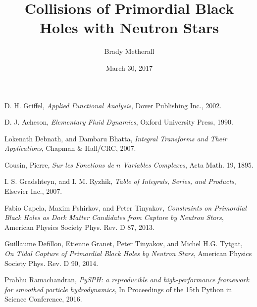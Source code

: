 \documentclass{jthesis}
\title{Collisions of Primordial Black Holes with Neutron Stars} %
\author{Brady Metherall}
\date{March 30, 2017}
\begin{document}
\maketitle



\makedeclaration

\maketableofcontents

\doublespacing
\linespread{2}









\begin{thebibliography}{9}

D. H. Griffel, \emph{Applied Functional Analysis}, Dover Publishing Inc., 2002.

D. J. Acheson, \emph{Elementary Fluid Dynamics}, Oxford University Press, 1990.

Lokenath Debnath, and Dambaru Bhatta, \emph{Integral Transforms and Their Applications}, Chapman \& Hall/CRC, 2007.

Cousin, Pierre, \emph{Sur les Fonctions de $n$ Variables Complexes}, Acta Math. 19, 1895.

I. S. Gradshteyn, and I. M. Ryzhik, \emph{Table of Integrals, Series, and Products}, Elsevier Inc., 2007.

Fabio Capela, Maxim Pshirkov, and Peter Tinyakov, \emph{Constraints on Primordial Black Holes as Dark Matter Candidates from Capture by Neutron Stars}, American Physics Society Phys. Rev. D 87, 2013.

Guillaume Defillon, Etienne Granet, Peter Tinyakov, and Michel H.G. Tytgat, \emph{On Tidal Capture of Primordial Black Holes by Neutron Stars}, American Physics Society Phys. Rev. D 90, 2014.

Prabhu Ramachandran, \emph{PySPH: a reproducible and high-performance framework for smoothed particle hydrodynamics}, In Proceedings of the 15th Python in Science Conference, 2016. 




\end{thebibliography}

%
%
\end{document}
